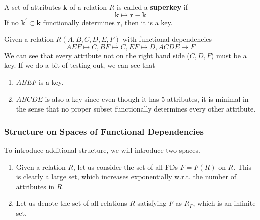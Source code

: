 \documentclass{article}
\begin{document}
    \begin{definition}[Superkey]
      A set of attributes $\mathbf{k}$ of a relation $R$ is called a \textbf{superkey} if 
      \begin{equation}
        \mathbf{k} \mapsto \mathbf{r} - \mathbf{k}
      \end{equation}
      If no $\mathbf{k}^\prime \subset \mathbf{k}$ functionally determines $\mathbf{r}$, then it is a key. 
    \end{definition}
    
    \begin{example}[Warning!]
      Given a relation $R(A, B, C, D, E, F)$ with functional dependencies 
      \begin{equation}
        AEF \mapsto C, BF \mapsto C, EF \mapsto D, ACDE \mapsto F
      \end{equation}
      We can see that every attribute not on the right hand side ($C, D, F$) must be a key. If we do a bit of testing out, we can see that 
      \begin{enumerate}
        \item $ABEF$ is a key. 
        \item $ABCDE$ is also a key since even though it has 5 attributes, it is minimal in the sense that no proper subset functionally determines every other attribute.   
      \end{enumerate}
    \end{example}

    \subsubsection{Structure on Spaces of Functional Dependencies}

      To introduce additional structure, we will introduce two spaces. 
      \begin{enumerate}
        \item Given a relation $R$, let us consider the set of all FDs $F = F(R)$ on $R$. This is clearly a large set, which increases exponentially w.r.t. the number of attributes in $R$. 
        \item Let us denote the set of all relations $R$ satisfying $F$ as $R_F$, which is an infinite set. 
      \end{enumerate}
\end{document}
